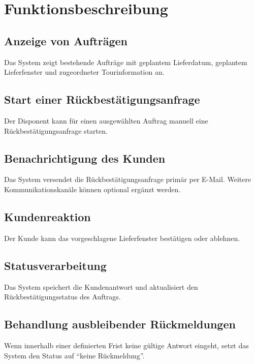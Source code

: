 \documentclass[12pt,a4paper]{article}
\begin{document}
\section{Funktionsbeschreibung}

\subsection{Anzeige von Aufträgen}

Das System zeigt bestehende Aufträge mit geplantem Lieferdatum, geplantem Lieferfenster und zugeordneter Tourinformation an.

\subsection{Start einer Rückbestätigungsanfrage}

Der Disponent kann für einen ausgewählten Auftrag manuell eine Rückbestätigungsanfrage starten.

\subsection{Benachrichtigung des Kunden}

Das System versendet die Rückbestätigungsanfrage primär per E-Mail. 
Weitere Kommunikationskanäle können optional ergänzt werden.

\subsection{Kundenreaktion}

Der Kunde kann das vorgeschlagene Lieferfenster bestätigen oder ablehnen.

\subsection{Statusverarbeitung}

Das System speichert die Kundenantwort und aktualisiert den Rückbestätigungsstatus des Auftrags.

\subsection{Behandlung ausbleibender Rückmeldungen}

Wenn innerhalb einer definierten Frist keine gültige Antwort eingeht, setzt das System den Status auf ``keine Rückmeldung''.
\end{document}

